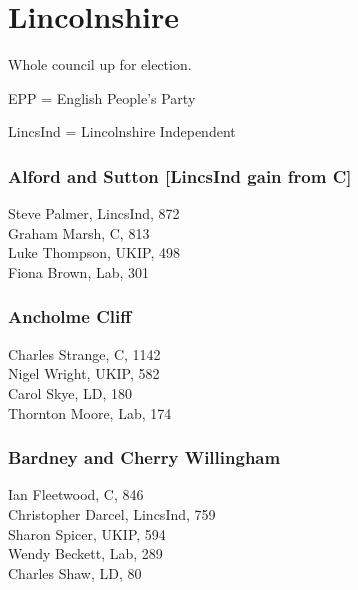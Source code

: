 \documentclass[a4paper,openany,10pt]{book}
\begin{document}
\vfill

\section{Lincolnshire}

Whole council up for election.

EPP = English People's Party

LincsInd = Lincolnshire Independent



\subsubsection*{Alford and Sutton \hspace*{\fill}\nolinebreak[1]%
\enspace\hspace*{\fill}
[LincsInd gain from C]}



Steve Palmer, LincsInd, 872\\
Graham Marsh, C, 813\\
Luke Thompson, UKIP, 498\\
Fiona Brown, Lab, 301\\


\subsubsection*{Ancholme Cliff}



Charles Strange, C, 1142\\
Nigel Wright, UKIP, 582\\
Carol Skye, LD, 180\\
Thornton Moore, Lab, 174\\


\subsubsection*{Bardney and Cherry Willingham}



Ian Fleetwood, C, 846\\
Christopher Darcel, LincsInd, 759\\
Sharon Spicer, UKIP, 594\\
Wendy Beckett, Lab, 289\\
Charles Shaw, LD, 80\\
\end{document}
